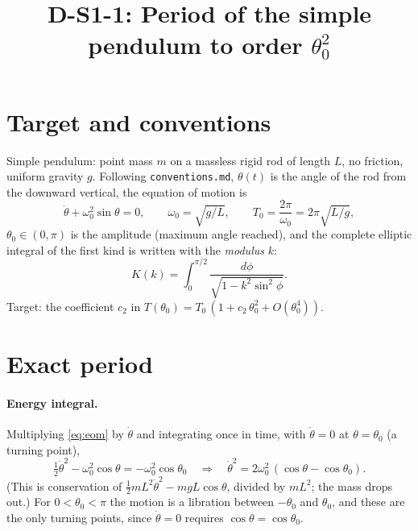 \documentclass{article}
\title{D-S1-1: Period of the simple pendulum to order $\theta_0^2$}
\date{}
\begin{document}
\maketitle

\section*{Target and conventions}

Simple pendulum: point mass $m$ on a massless rigid rod of length $L$, no
friction, uniform gravity $g$. Following \texttt{conventions.md}, $\theta(t)$
is the angle of the rod from the downward vertical, the equation of motion is
\begin{equation}
  \ddot\theta + \omega_0^2 \sin\theta = 0, \qquad \omega_0 = \sqrt{g/L},
  \qquad T_0 = \frac{2\pi}{\omega_0} = 2\pi\sqrt{L/g},
  \label{eq:eom}
\end{equation}
$\theta_0 \in (0,\pi)$ is the amplitude (maximum angle reached), and the
complete elliptic integral of the first kind is written with the
\emph{modulus} $k$:
\begin{equation}
  K(k) = \int_0^{\pi/2} \frac{d\phi}{\sqrt{1 - k^2 \sin^2\phi}} .
  \label{eq:Kdef}
\end{equation}
Target: the coefficient $c_2$ in
$T(\theta_0) = T_0\,(1 + c_2\,\theta_0^2 + O(\theta_0^4))$.

\section{Exact period}

\paragraph{Energy integral.}
Multiplying \eqref{eq:eom} by $\dot\theta$ and integrating once in time,
with $\dot\theta = 0$ at $\theta = \theta_0$ (a turning point),
\begin{equation}
  \tfrac12 \dot\theta^2 - \omega_0^2 \cos\theta = - \omega_0^2 \cos\theta_0
  \quad\Longrightarrow\quad
  \dot\theta^2 = 2\omega_0^2 \,(\cos\theta - \cos\theta_0).
  \label{eq:energy}
\end{equation}
(This is conservation of $\tfrac12 m L^2\dot\theta^2 - m g L\cos\theta$,
divided by $mL^2$; the mass drops out.) For $0<\theta_0<\pi$ the motion is a
libration between $-\theta_0$ and $\theta_0$, and these are the only turning
points, since $\dot\theta = 0$ requires $\cos\theta = \cos\theta_0$.
\end{document}
